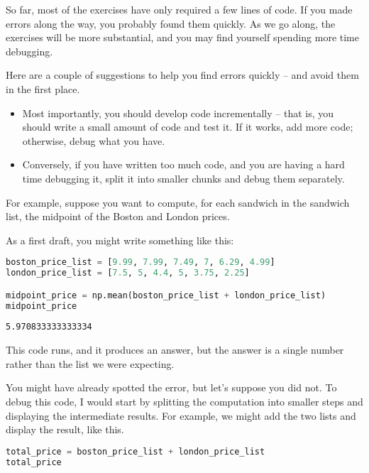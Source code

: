 So far, most of the exercises have only required a few lines of code. If
you made errors along the way, you probably found them quickly.
As we go along, the exercises will be more substantial, and you may find
yourself spending more time debugging.

\pagebreak

Here are a couple of suggestions
to help you find errors quickly -- and avoid them in the first place.

\begin{itemize}
\item
  Most importantly, you should develop code incrementally -- that is,
  you should write a small amount of code and test it. If it works, add
  more code; otherwise, debug what you have.
\item
  Conversely, if you have written too much code, and you are having a
  hard time debugging it, split it into smaller chunks and debug them
  separately.
\end{itemize}

For example, suppose you want to compute, for each sandwich in the
sandwich list, the midpoint of the Boston and London prices.

As a first
draft, you might write something like this:

\begin{lstlisting}[language=Python,style=source]
boston_price_list = [9.99, 7.99, 7.49, 7, 6.29, 4.99]
london_price_list = [7.5, 5, 4.4, 5, 3.75, 2.25]

midpoint_price = np.mean(boston_price_list + london_price_list)
midpoint_price
\end{lstlisting}

\begin{lstlisting}[style=output]
5.970833333333334
\end{lstlisting}

This code runs, and it produces an answer, but the answer is a single
number rather than the list we were expecting.

You might have already spotted the error, but let's suppose you did not.
To debug this code, I would start by splitting the computation into
smaller steps and displaying the intermediate results. For example, we
might add the two lists and display the result, like this.

\begin{lstlisting}[language=Python,style=source]
total_price = boston_price_list + london_price_list
total_price
\end{lstlisting}

